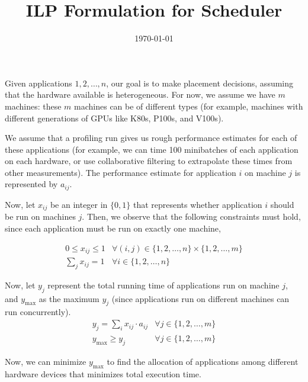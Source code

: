 \documentclass{article}
\title{ILP Formulation for Scheduler}
\date{\today}
\begin{document}
\maketitle

Given applications $1, 2, \ldots, n$, our goal is to make placement
decisions, assuming that the hardware available is heterogeneous. For now, we
assume we have $m$ machines: these $m$ machines can be of different types (for
example, machines with different generations of GPUs like K80s, P100s, and V100s).

We assume that a profiling run gives us rough performance estimates for each
of these applications (for example, we can time 100 minibatches of each application
on each hardware, or use collaborative filtering to extrapolate these
times from other measurements). The performance estimate for application $i$
on machine $j$ is represented by $a_{ij}$.

Now, let $x_{ij}$ be an integer in $\{0, 1\}$ that represents whether application $i$ should be run on
machines $j$. Then, we observe that the following constraints
must hold, since each application must be run on exactly one machine,

\begin{eqnarray}
0 \leq x_{ij} \leq 1 & \forall (i,j) \in \{1, 2, \ldots, n\} \times \{1, 2, \ldots, m\} \nonumber  \\
\sum_j x_{ij} = 1 & \forall i \in \{1, 2, \ldots, n\} \nonumber
\end{eqnarray}

Now, let $y_j$ represent the total running time of applications run on machine
$j$, and $y_{\text{max}}$ as the maximum $y_j$ (since applications run on different
machines can run concurrently).
\begin{eqnarray}
y_j = \sum_i x_{ij} \cdot a_{ij} & \forall j \in \{1, 2, \ldots, m\} \nonumber \\
y_{\text{max}} \geq y_j & \forall j \in \{1, 2, \ldots, m\} \nonumber
\end{eqnarray}

Now, we can minimize $y_{\text{max}}$ to find the allocation of applications
among different hardware devices that minimizes total execution time.
\end{document}
